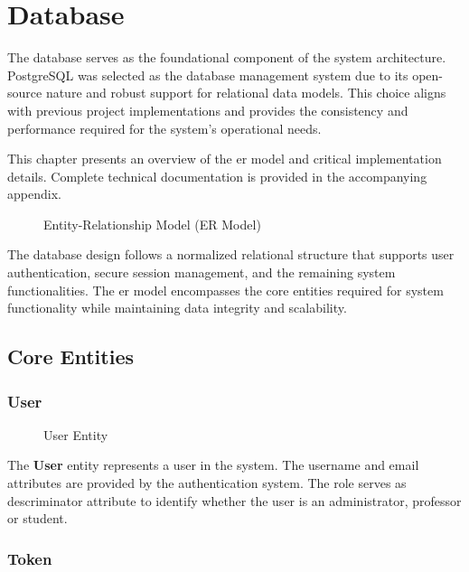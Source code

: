 \chapter{Database} \label{cap:database}
The database serves as the foundational component of the system architecture. PostgreSQL was selected as the database management system due to its open-source nature and robust support for relational data models. This choice aligns with previous project implementations and provides the consistency and performance required for the system's operational needs.

This chapter presents an overview of the \ac{er model} and critical implementation details. Complete technical documentation is provided in the accompanying appendix.

\begin{figure}[H]
    \centering
    
    \caption{Entity-Relationship Model (ER Model)}
    \label{fig:er_model}
\end{figure}

The database design follows a normalized relational structure that supports user authentication, secure session management, and the remaining system functionalities. The \acs{er model} encompasses the core entities required for system functionality while maintaining data integrity and scalability.

\section{Core Entities}
\subsection*{User}

\begin{figure}[H]
    \centering
    
    \caption{User Entity}
    \label{fig:user_entity}
\end{figure}

The \textbf{User} entity represents a user in the system. The username and email attributes are provided by the authentication system. The role serves as descriminator attribute to identify whether the user is an administrator, professor or student.

\subsection*{Token}

